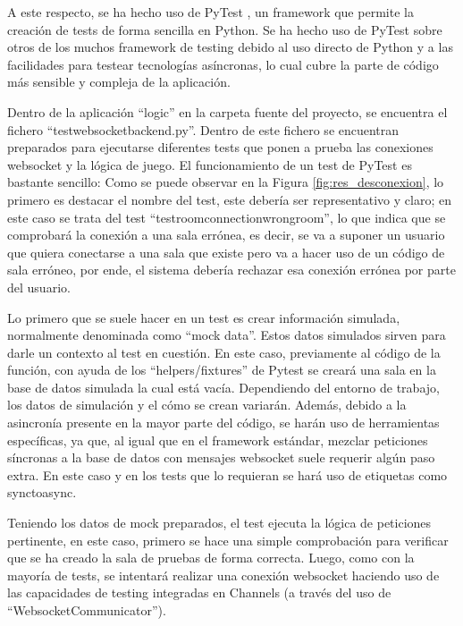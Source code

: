 A este respecto, se ha hecho uso de PyTest \cite{pytest}, un framework que permite la creación de tests de forma sencilla en Python. Se ha hecho uso
de PyTest sobre otros de los muchos framework de testing debido al uso directo de Python y a las facilidades para testear 
tecnologías asíncronas, lo cual cubre la parte de código más sensible y compleja de la aplicación.

Dentro de la aplicación ``logic'' en la carpeta fuente del proyecto, se encuentra el fichero ``test\textunderscore websocket\textunderscore backend.py''. Dentro de este fichero
se encuentran preparados para ejecutarse diferentes tests que ponen a prueba las conexiones websocket y la lógica de juego. El funcionamiento de un test 
de PyTest es bastante sencillo: Como se puede observar en la Figura \ref{fig:res_desconexion}, lo primero es destacar el nombre del test, este debería ser representativo y 
claro; en este caso se trata del test ``test\textunderscore room\textunderscore connection\textunderscore wrong\textunderscore room'', lo que indica que 
se comprobará la conexión a una sala errónea, es decir, se va a suponer un usuario que quiera conectarse a una sala que existe pero va a hacer uso
de un código de sala erróneo, por ende, el sistema debería rechazar esa conexión errónea por parte del usuario.

Lo primero que se suele hacer en un test es crear información simulada, normalmente denominada como ``mock data''. Estos datos simulados
sirven para darle un contexto al test en cuestión. En este caso, previamente al código de la función, con ayuda de los ``helpers/fixtures'' de Pytest 
se creará una sala en la base de datos simulada la cual está vacía. Dependiendo del entorno de trabajo, los datos de simulación y el cómo
se crean variarán. Además, debido a la asincronía presente en la mayor parte del código, se harán uso de herramientas específicas, ya que, al igual que 
en el framework estándar, mezclar peticiones síncronas a la base de datos con mensajes websocket suele requerir algún paso extra. En este caso y en los 
tests que lo requieran se hará uso de etiquetas como sync\textunderscore to\textunderscore async.

Teniendo los datos de mock preparados, el test ejecuta la lógica de peticiones pertinente, en este caso, primero se hace
una simple comprobación para verificar que se ha creado la sala de pruebas de forma correcta. Luego, como con la mayoría de tests,
se intentará realizar una conexión websocket haciendo uso de las capacidades de testing integradas en Channels (a través del uso de ``WebsocketCommunicator'').

